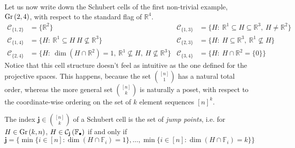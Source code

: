 Let us now write down the Schubert cells of the first non-trivial example, $\Gr{2}{4}$, with respect to the standard flag of $\mathbb{R}^4$.
\begin{align*}
\mathcal{C}_{\{1,2\}}&=\big\{\mathbb{R}^2\big\}&
\mathcal{C}_{\{1,3\}}&=\big\{H:\ \mathbb{R}^1\subseteq H\subseteq\mathbb{R}^3,\ H\neq\mathbb{R}^2\big\}\\
\mathcal{C}_{\{1,4\}}&=\big\{H:\ \mathbb{R}^1\subseteq H\ H\not\subseteq\mathbb{R}^3\big\}&
\mathcal{C}_{\{2,3\}}&=\big\{H:\ H\subseteq\mathbb{R}^3,\ \mathbb{R}^1\not\subseteq H\big\}\\
\mathcal{C}_{\{2,4\}}&=\big\{H:\ \dim(H\cap\mathbb{R}^2)=1,\ \mathbb{R}^1\not\subseteq H,\ H\not\subseteq\mathbb{R}^3\big\}&
\mathcal{C}_{\{3,4\}}&=\big\{H:\ H\cap\mathbb{R}^2=\{0\}\big\}
\end{align*}
Notice that this cell structure doesn't feel as intuitive as the one defined for the projective spaces. This happens, because the set $\binom{[n]}{1}$ has a natural total order, whereas the more general set $\binom{[n]}{k}$ is naturally a poset, with respect to the coordinate-wise ordering on the set of $k$ element sequences ${[n]}^k$.

\begin{remark} The index $\mathbf{j}\in\binom{[n]}{k}$ of a Schubert cell is the set of \emph{jump points}, i.e. for $H\in\Gr{k}{n}$, $H\in\mathcal{C}_{\mathbf{j}}\left(\mathbb{F}_{\bullet}\right)$ if and only if \[\mathbf{j}=\big\{\min\{i\in[n]:\dim(H\cap\mathbb{F}_i)=1\},\ldots,\min\{i\in[n]:\dim(H\cap\mathbb{F}_i)=k\}\big\}\]
\end{remark}

